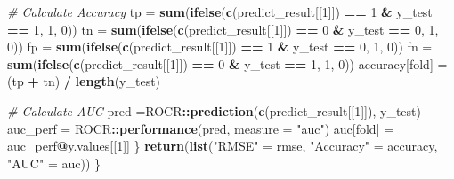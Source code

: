 \documentclass[
]{article}
\newenvironment{Shaded}{\begin{snugshade}}{\end{snugshade}}
\newcommand{\AttributeTok}[1]{\textcolor[rgb]{0.13,0.29,0.53}{#1}}
\newcommand{\CommentTok}[1]{\textcolor[rgb]{0.56,0.35,0.01}{\textit{#1}}}
\newcommand{\DecValTok}[1]{\textcolor[rgb]{0.00,0.00,0.81}{#1}}
\newcommand{\FunctionTok}[1]{\textcolor[rgb]{0.13,0.29,0.53}{\textbf{#1}}}
\newcommand{\NormalTok}[1]{#1}
\newcommand{\OtherTok}[1]{\textcolor[rgb]{0.56,0.35,0.01}{#1}}
\newcommand{\SpecialCharTok}[1]{\textcolor[rgb]{0.81,0.36,0.00}{\textbf{#1}}}
\newcommand{\StringTok}[1]{\textcolor[rgb]{0.31,0.60,0.02}{#1}}
\begin{document}
\begin{Shaded}
\begin{Highlighting}[]
    \CommentTok{\# Calculate Accuracy }
\NormalTok{    tp }\OtherTok{=} \FunctionTok{sum}\NormalTok{(}\FunctionTok{ifelse}\NormalTok{(}\FunctionTok{c}\NormalTok{(predict\_result[[}\DecValTok{1}\NormalTok{]]) }\SpecialCharTok{==} \DecValTok{1} \SpecialCharTok{\&}\NormalTok{ y\_test }\SpecialCharTok{==} \DecValTok{1}\NormalTok{, }\DecValTok{1}\NormalTok{, }\DecValTok{0}\NormalTok{))}
\NormalTok{    tn }\OtherTok{=} \FunctionTok{sum}\NormalTok{(}\FunctionTok{ifelse}\NormalTok{(}\FunctionTok{c}\NormalTok{(predict\_result[[}\DecValTok{1}\NormalTok{]]) }\SpecialCharTok{==} \DecValTok{0} \SpecialCharTok{\&}\NormalTok{ y\_test }\SpecialCharTok{==} \DecValTok{0}\NormalTok{, }\DecValTok{1}\NormalTok{, }\DecValTok{0}\NormalTok{))}
\NormalTok{    fp }\OtherTok{=} \FunctionTok{sum}\NormalTok{(}\FunctionTok{ifelse}\NormalTok{(}\FunctionTok{c}\NormalTok{(predict\_result[[}\DecValTok{1}\NormalTok{]]) }\SpecialCharTok{==} \DecValTok{1} \SpecialCharTok{\&}\NormalTok{ y\_test }\SpecialCharTok{==} \DecValTok{0}\NormalTok{, }\DecValTok{1}\NormalTok{, }\DecValTok{0}\NormalTok{))}
\NormalTok{    fn }\OtherTok{=} \FunctionTok{sum}\NormalTok{(}\FunctionTok{ifelse}\NormalTok{(}\FunctionTok{c}\NormalTok{(predict\_result[[}\DecValTok{1}\NormalTok{]]) }\SpecialCharTok{==} \DecValTok{0} \SpecialCharTok{\&}\NormalTok{ y\_test }\SpecialCharTok{==} \DecValTok{1}\NormalTok{, }\DecValTok{1}\NormalTok{, }\DecValTok{0}\NormalTok{))}
\NormalTok{    accuracy[fold] }\OtherTok{=}\NormalTok{ (tp }\SpecialCharTok{+}\NormalTok{ tn) }\SpecialCharTok{/} \FunctionTok{length}\NormalTok{(y\_test)}
    
    \CommentTok{\# Calculate AUC}
\NormalTok{    pred }\OtherTok{=}\NormalTok{ROCR}\SpecialCharTok{::}\FunctionTok{prediction}\NormalTok{(}\FunctionTok{c}\NormalTok{(predict\_result[[}\DecValTok{1}\NormalTok{]]), y\_test)}
\NormalTok{    auc\_perf }\OtherTok{=}\NormalTok{ ROCR}\SpecialCharTok{::}\FunctionTok{performance}\NormalTok{(pred, }\AttributeTok{measure =} \StringTok{"auc"}\NormalTok{)}
\NormalTok{    auc[fold] }\OtherTok{=}\NormalTok{ auc\_perf}\SpecialCharTok{@}\NormalTok{y.values[[}\DecValTok{1}\NormalTok{]]}
\NormalTok{  \}}
  \FunctionTok{return}\NormalTok{(}\FunctionTok{list}\NormalTok{(}\StringTok{"RMSE"} \OtherTok{=}\NormalTok{ rmse, }\StringTok{"Accuracy"} \OtherTok{=}\NormalTok{ accuracy, }\StringTok{"AUC"} \OtherTok{=}\NormalTok{ auc))}
\NormalTok{\}}
\end{Highlighting}
\end{Shaded}
\end{document}
